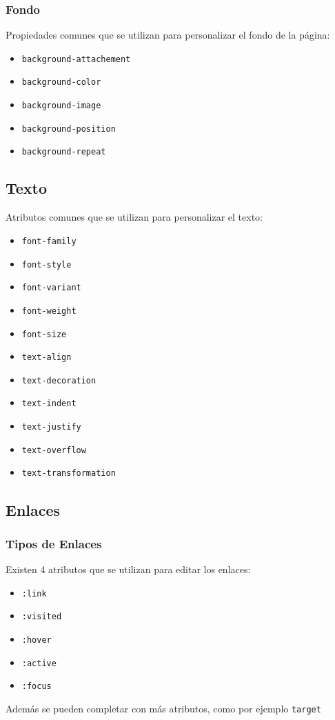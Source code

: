 \documentclass{beamer}
\begin{document}
\begin{frame}[fragile] %
\frametitle{Fondo}
	Propiedades comunes que se utilizan para personalizar el fondo de la página:
	\begin{itemize}
	\item \verb|background-attachement|
	\item \verb|background-color|	
	\item \verb|background-image|
	\item \verb|background-position|
	\item \verb|background-repeat|
	\end{itemize}
\end{frame}

	\subsection{Texto}
\begin{frame}[fragile]
	Atributos comunes que se utilizan para personalizar el texto:
	\begin{multicols}{2}
	\begin{itemize}
	\item \verb|font-family|
	\item \verb|font-style|
	\item \verb|font-variant|
	\item \verb|font-weight|
	\item \verb|font-size|
	\item \verb|text-align|
	\item \verb|text-decoration|
	\item \verb|text-indent|
	\item \verb|text-justify|
	\item \verb|text-overflow|
	\item \verb|text-transformation|
	\end{itemize}
	\end{multicols}
\end{frame}

	\subsection{Enlaces}
\begin{frame}[fragile] %
\frametitle{Tipos de Enlaces}
	Existen 4 atributos que se utilizan para editar los enlaces:
	\begin{itemize}
	\item \verb|:link|
	\item \verb|:visited|
	\item \verb|:hover|
	\item \verb|:active|
	\item \verb|:focus|
	\end{itemize}
	Además se pueden completar con más atributos, como por ejemplo \verb|target|
\end{frame}
\end{document}
